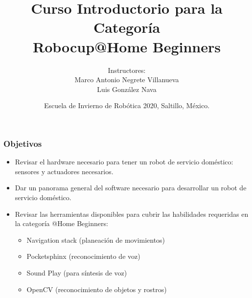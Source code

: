 \documentclass[10pt,spanish,aspectratio=1610]{beamer}
\begin{document}
\renewcommand{\tablename}{Tabla}
\renewcommand{\figurename}{Figura}

\title[Robocup@Home Beginners]{Curso Introductorio para la Categoría\\Robocup@Home Beginners}
\author[Marco Negrete y Luis González]{Instructores: \\ Marco Antonio Negrete Villanueva \\ Luis González Nava}
\date[EIR 2020]{Escuela de Invierno de Robótica 2020, Saltillo, México.}

\begin{frame}
\titlepage
\end{frame}

\begin{frame}\frametitle{Objetivos}
  \begin{itemize}
  \item Revisar el hardware necesario para tener un robot de servicio doméstico: sensores y actuadores necesarios.
  \item Dar un panorama general del software necesario para desarrollar un robot de servicio doméstico.
  \item Revisar las herramientas disponibles para cubrir las habilidades requeridas en la categoría @Home Beginners:
    \begin{itemize}
    \item Navigation stack (planeación de movimientos)
    \item Pocketsphinx (reconocimiento de voz)
    \item Sound Play (para síntesis de voz)
    \item OpenCV (reconocimiento de objetos y rostros)
    \end{itemize}
  \end{itemize}
\end{frame}

\end{document}
